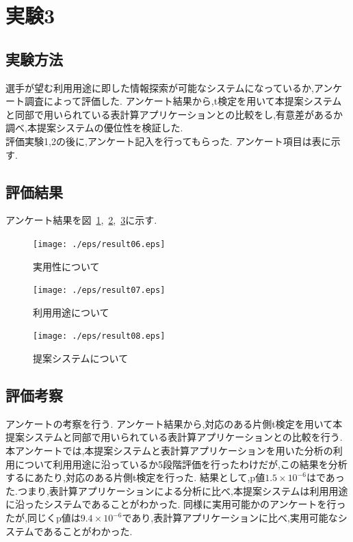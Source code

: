 \documentclass[sotsuron]{kuee}
\begin{document}
	\section{実験3}
		\subsection{実験方法}
			選手が望む利用用途に即した情報探索が可能なシステムになっているか,アンケート調査によって評価した.
			アンケート結果から,t検定を用いて本提案システムと同部で用いられている表計算アプリケーションとの比較をし,有意差があるか調べ,本提案システムの優位性を検証した.
			\\評価実験1,2の後に,アンケート記入を行ってもらった.
			アンケート項目は表に示す.
		\subsection{評価結果}
		アンケート結果を図~\ref{fig:result06},~\ref{fig:result07},~\ref{fig:result08}に示す.
			\begin{figure}
				\begin{center}
					\texttt{[image: ./eps/result06.eps]}
				\end{center}
				\caption{実用性について}
		  		\label{fig:result06}
			\end{figure}
			\begin{figure}
				\begin{center}
					\texttt{[image: ./eps/result07.eps]}
				\end{center}
				\caption{利用用途について}
		  		\label{fig:result07}
			\end{figure}
			\begin{figure}
				\begin{center}
					\texttt{[image: ./eps/result08.eps]}
				\end{center}
				\caption{提案システムについて}
		  		\label{fig:result08}
			\end{figure}
		\subsection{評価考察}
			アンケートの考察を行う.
			アンケート結果から,対応のある片側t検定を用いて本提案システムと同部で用いられている表計算アプリケーションとの比較を行う.
			本アンケートでは,本提案システムと表計算アプリケーションを用いた分析の利用について利用用途に沿っているか5段階評価を行ったわけだが,この結果を分析するにあたり,対応のある片側t検定を行った.
			結果として,p値$1.5 \times 10^{-6}$はであった.つまり,表計算アプリケーションによる分析に比べ,本提案システムは利用用途に沿ったシステムであることがわかった.
			同様に実用可能かのアンケートを行ったが,同じくp値は$9.4 \times 10^{-6}$であり,表計算アプリケーションに比べ,実用可能なシステムであることがわかった.
\end{document}
